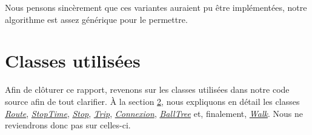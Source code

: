 \documentclass[12pt]{article}
\begin{document}
Nous pensons sincèrement que ces variantes auraient pu être implémentées, notre algorithme est assez générique pour le permettre.

\section{Classes utilisées}
Afin de clôturer ce rapport, revenons sur les classes utilisées dans notre code source afin de tout clarifier. À la section \hyperref[sec:init]{2}, nous expliquons
en détail les classes \hyperref[sec:route]{\emph{Route}}, \hyperref[sec:stoptime]{\emph{StopTime}}, \hyperref[sec:stop]{\emph{Stop}}, \hyperref[sec:trip]{\emph{Trip}},
\hyperref[sec:connexion]{\emph{Connexion}}, \hyperref[sec:balltree]{\emph{BallTree}} et, finalement, \hyperref[sec:walk]{\emph{Walk}}. Nous ne reviendrons donc pas sur
celles-ci.
\end{document}
